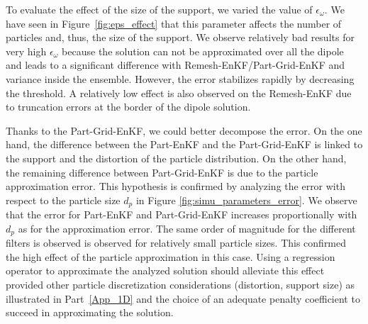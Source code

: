 To evaluate the effect of the size of the support, we varied the value of $\epsilon_{\omega}$. We have seen in Figure~\ref{fig:eps_effect} that this parameter affects the number of particles and, thus, the size of the support. We observe relatively bad results for very high $\epsilon_{\omega}$ because the solution can not be approximated over all the dipole and leads to a significant difference with Remesh-EnKF/Part-Grid-EnKF and variance inside the ensemble. However, the error stabilizes rapidly by decreasing the threshold. A relatively low effect is also observed on the Remesh-EnKF due to truncation errors at the border of the dipole solution.

Thanks to the Part-Grid-EnKF, we could better decompose the error. On the one hand, the difference between the Part-EnKF and the Part-Grid-EnKF is linked to the support and the distortion of the particle distribution. On the other hand, the remaining difference between Part-Grid-EnKF is due to the particle approximation error. This hypothesis is confirmed by analyzing the error with respect to the particle size $d_p$ in Figure \ref{fig:simu_parameters_error}. We observe that the error for Part-EnKF and Part-Grid-EnKF increases proportionally with $d_p$ as for the approximation error. The same order of magnitude for the different filters is observed is observed for relatively small particle sizes. This confirmed the high effect of the particle approximation in this case. Using a regression operator to approximate the analyzed solution should alleviate this effect provided other particle discretization considerations (distortion, support size) as illustrated in Part~\ref{App_1D} and the choice of an adequate penalty coefficient to succeed in approximating the solution.

